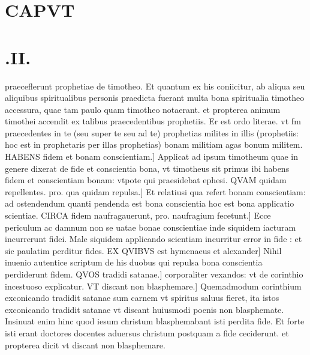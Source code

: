 \documentclass{article}
\begin{document}
\begin{pages}
\section*{CAPVT }
\section*{.II. }\pstart praeceflerunt prophetiae de timotheo. Et quantum ex his coniicitur, ab aliqua seu aliquibus spiritualibus personis praedicta fuerant multa bona spiritualia timotheo accessura, quae tam paulo quam timotheo notaerant. et propterea animum timothei accendit ex talibus praecedentibus prophetiis. Er est ordo literae. vt fm praecedentes in te (seu super te seu ad te) prophetias milites in illis (prophetiis: hoc est in prophetaris per illas prophetias) bonam militiam agas bonum militem. HABENS fidem et bonam conscientiam.] Applicat ad ipsum timotheum quae in genere dixerat de fide et conscientia bona, vt timotheus sit primus ibi habens fidem et conscientiam bonam: vtpote qui praesidebat ephesi. QVAM quidam repellentes. pro. qua quidam repulsa.] Et relatiusi qua refert bonam conscientiam: ad ostendendum quanti pendenda est bona conscientia hoc est bona applicatio scientiae. CIRCA fidem naufragauerunt, pro. naufragium fecetunt.] Ecce periculum ac damnum non se uatae bonae conscientiae inde siquidem iacturam incurrerunt fidei. Male siquidem applicando scientiam incurritur error in fide : et sic paulatim perditur fides. EX QVIBVS est hymenaeus et alexander] Nihil inuenio autentice scriptum de his duobus qui repulsa bona conscientia perdiderunt fidem. QVOS tradidi satanae.] corporaliter vexandos: vt de corinthio incestuoso explicatur. VT discant non blasphemare.] Quemadmodum corinthium exconicando tradidit satanae sum carnem vt spiritus saluus fieret, ita istos exconicando tradidit satanae vt discant huiusmodi poenis non blasphemate. Insinuat enim hinc quod iesum christum blasphemabant isti perdita fide. Et forte isti erant doctores docentes aduersus christum postquam a fide ceciderunt. et propterea dicit vt discant non blasphemare.  \pend

\end{pages}
\end{document}
